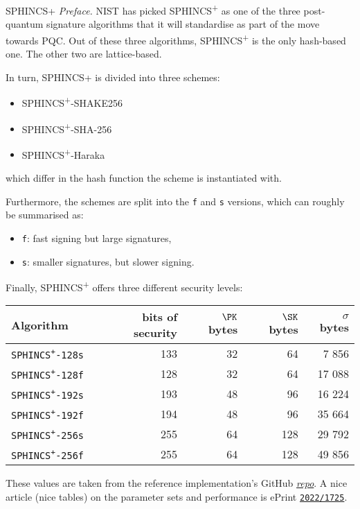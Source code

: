 \documentclass{practice}
\begin{document}
\begin{task}{SPHINCS+}
  \textit{Preface.}
  NIST has picked SPHINCS\textsuperscript{+} as one of the three post-quantum signature algorithms that it will standardise as part of the move towards PQC.
  Out of these three algorithms, SPHINCS\textsuperscript{+} is the only hash-based one.
  The other two are lattice-based.

  In turn, SPHINCS+ is divided into three schemes:
  \begin{itemize}
    \item SPHINCS\textsuperscript{+}-SHAKE256
    \item SPHINCS\textsuperscript{+}-SHA-256
    \item SPHINCS\textsuperscript{+}-Haraka
  \end{itemize}
  which differ in the hash function the scheme is instantiated with.

  Furthermore, the schemes are split into the \texttt{f} and \texttt{s} versions, which can roughly be summarised as:
  \begin{itemize}
    \item \texttt{f}: fast signing but large signatures,
    \item \texttt{s}: smaller signatures, but slower signing.
  \end{itemize}

  Finally, SPHINCS\textsuperscript{+} offers three different security levels:
  \begin{center}
    \begin{tabular}{@{}l r r r r@{}}
      \toprule
      Algorithm & bits of security & $\PK$ bytes & $\SK$ bytes & $\sigma$ bytes\\
      \midrule
      \texttt{SPHINCS\textsuperscript{+}-128s} & 133 & 32 &  64 &  7 856\\
      \texttt{SPHINCS\textsuperscript{+}-128f} & 128 & 32 &  64 & 17 088\\
      \texttt{SPHINCS\textsuperscript{+}-192s} & 193 & 48 &  96 & 16 224\\
      \texttt{SPHINCS\textsuperscript{+}-192f} & 194 & 48 &  96 & 35 664\\
      \texttt{SPHINCS\textsuperscript{+}-256s} & 255 & 64 & 128 & 29 792\\
      \texttt{SPHINCS\textsuperscript{+}-256f} & 255 & 64 & 128 & 49 856\\
      \bottomrule
    \end{tabular}
  \end{center}
  These values are taken from the reference implementation's GitHub \href{https://github.com/sphincs/sphincsplus}{\textit{repo}}.
  A nice article (nice tables) on the parameter sets and performance is ePrint \href{https://eprint.iacr.org/2022/1725}{\texttt{2022/1725}}.


\end{task}
\end{document}
